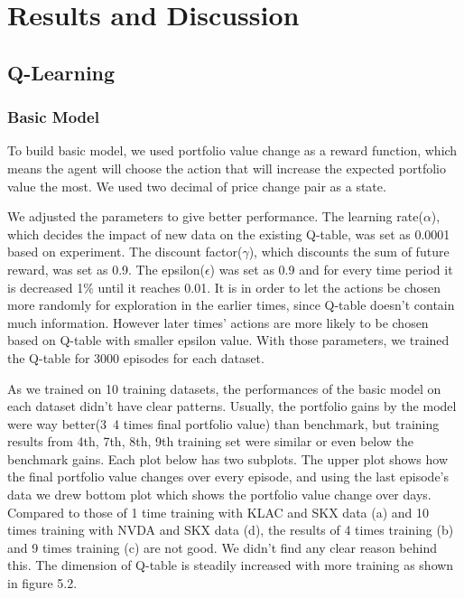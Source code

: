 \chapter{Results and Discussion}
\label{Ch:Result and Discussion}
\section{Q-Learning}

\subsection{Basic Model}
To build basic model, we used portfolio value change as a reward function, which means the agent will choose the action that will increase the expected portfolio value the most. We used two decimal of price change pair as a state.

We adjusted the parameters to give better performance. The learning rate($\alpha$), which decides the impact of new data on the existing Q-table, was set as 0.0001 based on experiment. The discount factor($\gamma$), which discounts the sum of future reward, was set as 0.9. The epsilon($\epsilon$) was set as 0.9 and for every time period it is decreased 1\% until it reaches 0.01. It is in order to let the actions be chosen more randomly for exploration in the earlier times, since Q-table doesn’t contain much information. However later times’ actions are more likely to be chosen based on Q-table with smaller epsilon value. With those parameters, we trained the Q-table for 3000 episodes for each dataset.

As we trained on 10 training datasets, the performances of the basic model on each dataset didn’t have clear patterns. Usually, the portfolio gains by the model were way better(3~4 times final portfolio value) than benchmark, but training results from 4th, 7th, 8th, 9th training set were similar or even below the benchmark gains. Each plot below has two subplots. The upper plot shows how the final portfolio value changes over every episode, and using the last episode’s data we drew bottom plot which shows the portfolio value change over days. Compared to those of 1 time training with KLAC and SKX data (a) and 10 times training with NVDA and SKX data (d), the results of 4 times training (b) and 9 times training (c) are not good. We didn’t find any clear reason behind this. The dimension of Q-table is steadily increased with more training as shown in figure 5.2.

